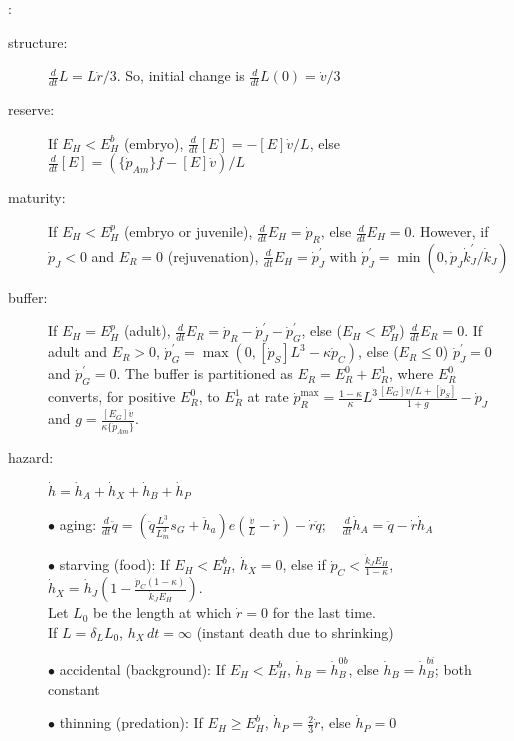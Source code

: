\vspace*{5mm}: {\small
\begin{description}
  \item[structure: ] $\frac{d} {dt} L = L \dot{r}/ 3$.
		So, initial change is $\frac{d} {dt} L(0) = \dot{v}/ 3$
			
  \item[reserve:] If $E_H < E_H^b$ (embryo), $\frac{d} {dt} [E] = - [E] \dot{v}/ L$, else $\frac{d} {dt} [E] = (\{\dot{p}_{Am}\} f - [E] \dot{v})/ L$
	
  \item[maturity:] If $E_H < E_H^p$ (embryo or juvenile), $\frac{d} {dt} E_H = \dot{p}_R$, else $\frac{d} {dt} E_H = 0$. 
	  However, if $\dot{p}_J < 0$ and $E_R = 0$ (rejuvenation), 
	    $\frac{d} {dt} E_H = \dot{p}_J^\prime$ with $\dot{p}_J^\prime = \min(0, \dot{p}_J \dot{k}_J^\prime/ \dot{k}_J)$
			
  \item[buffer:] If $E_H = E_H^p$ (adult), $\frac{d} {dt} E_R = \dot{p}_R - \dot{p}_J^\prime - \dot{p}_G^\prime$, 
	  else ($E_H < E_H^p$) $\frac{d} {dt} E_R = 0$.
		If adult and $E_R > 0$, $\dot{p}_G^\prime = \max(0, [\dot{p}_S] L^3 - \kappa \dot{p}_C)$, 
		  else ($E_R \le 0$) $\dot{p}_J^\prime = 0$ and $\dot{p}_G^\prime = 0$.
		The buffer is partitioned as $E_R = E_R^0 + E_R^1$, where $E_R^0$ converts, for positive $E_R^0$, to $E_R^1$ at rate
			$\dot{p}_R^{\max} = \frac{1 - \kappa} {\kappa} L^3 \frac{[E_G] \dot{v}/L + [\dot{p}_S]} {1 + g} - \dot{p}_J$ and 
			$g = \frac{[E_G] \dot{v}}{\kappa \{\dot{p}_{Am}\}}$.
			
  \item[hazard:] $\dot{h} = \dot{h}_A + \dot{h}_X + \dot{h}_B + \dot{h}_P$
	
	  \subitem $\bullet$ aging: 
			$\frac{d} {dt} \ddot{q} = (\ddot{q} \frac{L^3} {L_m^3} s_G + \ddot{h}_a) e (\frac{\dot{v}} {L} - \dot{r}) - \dot{r} \ddot{q}; \quad 
      \frac{d} {dt} \dot{h}_A = \ddot{q} - \dot{r} \dot{h}_A$
				
	  \subitem $\bullet$ starving (food): If $E_H < E_H^b$, $\dot{h}_X = 0$, else if $\dot{p}_C   < \frac{\dot{k}_J E_H} {1 - \kappa}$, 
			$\dot{h}_X = \dot{h}_J (1 - \frac{\dot{p}_C (1 - \kappa)} {\dot{k}_J E_H})$.\\
			\hspace*{9mm} Let $L_0$ be the length at which $\dot{r} = 0$ for the last time.\\ 
			\hspace*{9mm} If $L = \delta_L L_0$, $h_X \, dt = \infty$ (instant death due to shrinking)
				
		\subitem $\bullet$ accidental (background): If $E_H < E_H^b$, $\dot{h}_B = \dot{h}_B^{0b}$, else $\dot{h}_B = \dot{h}_B^{bi}$; both constant
			
	  \subitem $\bullet$ thinning (predation): If $E_H \ge E_H^b$, $\dot{h}_P = \frac{2} {3} \dot{r}$, else $\dot{h}_P = 0$	
\end{description}}
	
